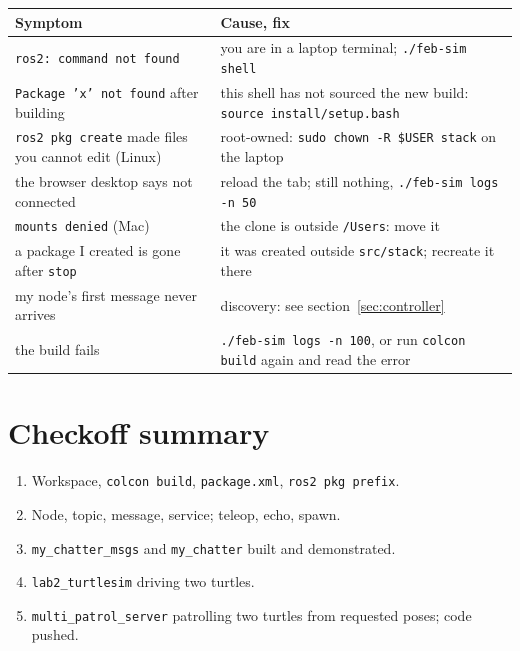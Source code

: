 \documentclass[11pt,a4paper]{article}
\begin{document}
\noindent\begin{tabularx}{\linewidth}{lX}
\toprule
Symptom & Cause, fix \\
\midrule
\texttt{ros2: command not found} & you are in a laptop terminal; \texttt{./feb-sim shell} \\
\texttt{Package 'x' not found} after building & this shell has not sourced the new build: \texttt{source install/setup.bash} \\
\texttt{ros2 pkg create} made files you cannot edit (Linux) & root-owned: \texttt{sudo chown -R \$USER stack} on the laptop \\
the browser desktop says not connected & reload the tab; still nothing, \texttt{./feb-sim logs -n 50} \\
\texttt{mounts denied} (Mac) & the clone is outside \texttt{/Users}: move it \\
a package I created is gone after \texttt{stop} & it was created outside \texttt{src/stack}; recreate it there \\
my node's first message never arrives & discovery: see section~\ref{sec:controller} \\
the build fails & \texttt{./feb-sim logs -n 100}, or run \texttt{colcon build} again and read the error \\
\bottomrule
\end{tabularx}

\section*{Checkoff summary}

\begin{enumerate}
  \item Workspace, \texttt{colcon build}, \texttt{package.xml}, \texttt{ros2 pkg prefix}.
  \item Node, topic, message, service; teleop, echo, spawn.
  \item \texttt{my\_chatter\_msgs} and \texttt{my\_chatter} built and demonstrated.
  \item \texttt{lab2\_turtlesim} driving two turtles.
  \item \texttt{multi\_patrol\_server} patrolling two turtles from requested poses; code pushed.
\end{enumerate}
\end{document}
